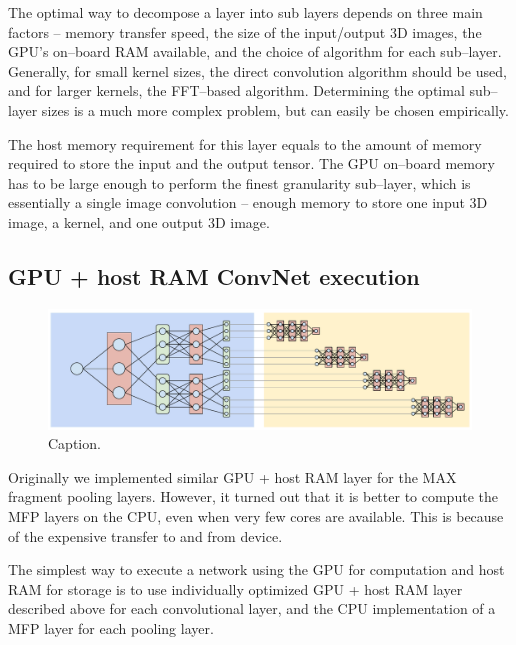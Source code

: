 \documentclass[conference]{./IEEEtran/IEEEtran}
\begin{document}
  The optimal way to decompose a layer into sub layers depends on
  three main factors -- memory transfer speed, the size of the
  input/output 3D images, the GPU's on--board RAM available, and the
  choice of algorithm for each sub--layer.  Generally, for small
  kernel sizes, the direct convolution algorithm should be used, and
  for larger kernels, the FFT--based algorithm.  Determining the
  optimal sub--layer sizes is a much more complex problem, but can
  easily be chosen empirically.

  The host memory requirement for this layer equals to the amount of
  memory required to store the input and the output tensor.  The GPU
  on--board memory has to be large enough to perform the finest
  granularity sub--layer, which is essentially a single image
  convolution -- enough memory to store one input 3D image, a kernel,
  and one output 3D image.

\subsection{GPU + host RAM ConvNet execution}


  \begin{figure}
    \begin{center}
      \includegraphics[width=0.99\columnwidth]{fig/layer_vs_batch.pdf}
    \end{center}
    \caption{Caption.}
    \label{fig:layer-vs-batch}
  \end{figure}

  Originally we implemented similar GPU + host RAM layer for the MAX
  fragment pooling layers.  However, it turned out that it is better
  to compute the MFP layers on the CPU, even when very few cores are
  available. This is because of the expensive transfer to and from
  device.

  The simplest way to execute a network using the GPU for computation
  and host RAM for storage is to use individually optimized GPU + host
  RAM layer described above for each convolutional layer, and the CPU
  implementation of a MFP layer for each pooling layer.
\end{document}
